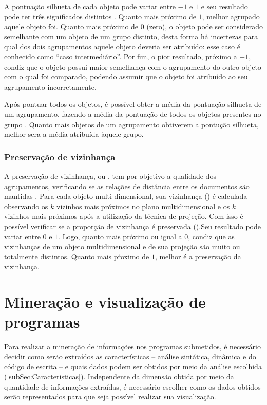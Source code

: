 				A pontuação silhueta de cada objeto pode variar entre $-1$ e $1$ e seu resultado
				pode ter três significados distintos \cite{rousseeuw1987silhouettes}.
				Quanto mais próximo de $1$, melhor agrupado aquele objeto foi. Quanto mais
				próximo de $0$ (zero), o objeto pode ser considerado semelhante com um objeto
				de um grupo distinto, desta forma há incertezas para qual dos dois agrupamentos
				aquele objeto deveria ser atribuído: esse caso é conhecido como ``caso intermediário''.
				Por fim, o pior resultado, próximo a $-1$, condiz que o objeto possui maior
				semelhança com o agrupamento do outro objeto com o qual foi comparado, podendo
				assumir que o objeto foi atribuído ao seu agrupamento incorretamente.
				
				Após pontuar todos os objetos, é possível obter a média da pontuação silhueta
				de um agrupamento, fazendo a média da pontuação de todos os objetos
				presentes no grupo \cite{Tan:2005:ch8}. Quanto mais objetos de um agrupamento
				obtiverem a pontução silhueta, melhor sera a média atribuída àquele grupo.
				
			\subsubsection{Preservação de vizinhança}
			\label{subsubsec:vizinhanca}
			
				A preservação de vizinhança, ou 
				\cite{paulovich2008hipp}, tem por objetivo a qualidade dos agrupamentos,
				verificando se as relações de distância entre os documentos são mantidas
				\cite{phd:paulovich}. Para cada objeto multi-dimensional, sua vizinhança
				() é calculada observando os $k$ vizinhos mais
				próximos no plano multidimensional e os $k$ vizinhos mais próximos após a
				utilização da técnica de projeção. Com isso é possível verificar se a
				proporção de vizinhança é preservada ().Seu resultado
				pode variar entre $0$ e $1$. Logo, quanto mais próximo ou igual a
				$0$, condiz que as vizinhanças de um objeto multidimensional e de sua projeção
				são muito ou totalmente distintos. Quanto mais pŕoximo de $1$, melhor é a
				preservação da vizinhança.

	\section{Mineração e visualização de programas}
	\label{sec:MinVisual}
		Para realizar a mineração de informações nos programas submetidos, é necessário
		decidir como serão extraídos as características -- análise sintática, dinâmica e
		do código de escrita -- e quais dados podem ser obtidos por meio da análise
		escolhida (\cref{subSec:Caracteristicas}). Independente da dimensão
		obtida por meio da quantidade de informações extraídas, é necessário escolher
		como os dados obtidos serão representados para que seja possível realizar sua visualização.
		
